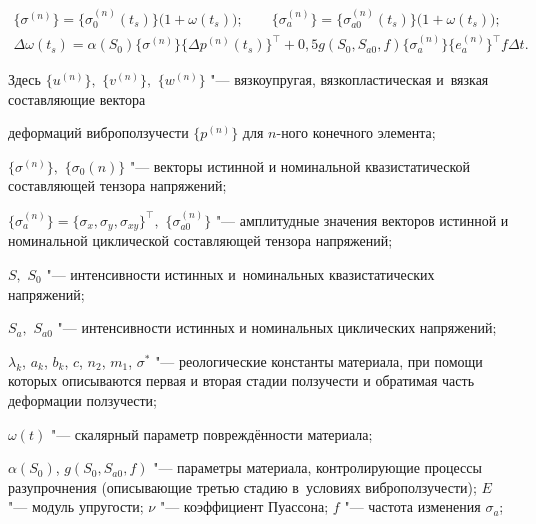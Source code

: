 \begin{gather}
\begin{array}{l}
\end{array}

\\

\label{eq:4:3:9}

\{\sigma^{(n)}\} = \{\sigma_{0}^{(n)}(t_s) \}\bigl(1+\omega(t_s)\bigr);\qquad 

\displaystyle

\{\sigma_a^{(n)} \} = \{\sigma_{a0}^{(n)}(t_s) \}\bigl(1+\omega(t_s)\bigr);

\\

\label{eq:4:3:10}

\Delta \omega(t_s) =

\alpha(S_0)\{\sigma^{(n)} \} \{\Delta p^{(n)} (t_s) \}^\top + 0,5 g(S_0, S_{a0}, f) \{\sigma^{(n)}_{a}\}\{e^{(n)}_{a}\}^\top  f\Delta t.

\end{gather}



\noindent Здесь $\{u^{(n)}\},$ $\{v^{(n)}\},$ $\{w^{(n)}\}$ "--- вязкоупругая, вязкопластическая и~вязкая составляющие вектора

деформаций виброползучести $\{p^{(n)}\}$ для $n$-ного конечного элемента; 

$\{\sigma^{(n)}\},$ $\{\sigma_0{(n)}\}$ "---  векторы истинной и номинальной  квазистатической составляющей тензора напряжений; 

$\{\sigma_{a}^{(n)}\}=\{\sigma_x, \sigma_y, \sigma_{xy}\}^\top,$ $\{\sigma_{a0}^{(n)}\}$ "--- амплитудные значения векторов истинной и номинальной циклической составляющей тензора напряжений; 

$S,$ $S_0$ "--- интенсивности истинных и~номинальных квазистатических напряжений; 

$S_{a},$ $S_{a0}$ "--- интенсивности истинных и номинальных циклических напряжений; 

$\lambda_k$, $a_k$, $b_k$, $c$, $n_2$, $m_1$, $\sigma^*$ "--- реологические константы материала, при помощи которых описываются первая и вторая стадии ползучести и обратимая часть деформации ползуче­сти;

$\omega(t)$ "--- скалярный параметр повреждённости материала;

$\alpha (S_0 )$, $g(S_0, S_{a0}, f )$ "--- параметры материала, контролирующие процессы разупрочнения (описывающие третью стадию в~условиях виброползучести); $E$ "--- модуль упругости; $\nu$ "--- коэффициент Пуассона; $f$ "--- частота изменения $\sigma_a$;

